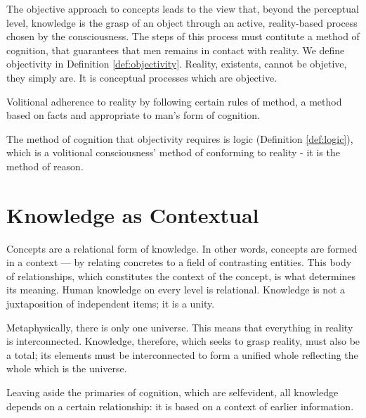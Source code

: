         The objective approach to concepts leads to the view that, beyond the perceptual level, knowledge is the grasp of an object through an active, reality-based process chosen by the consciousness. The steps of this process must contitute a method of cognition, that guarantees that men remains in contact with reality. We define objectivity in Definition \ref{def:objectivity}. Reality, existents, cannot be objetive, they simply are. It is conceptual processes which are objective.

            \begin{definition}[Obectivity]
            \label{def:objectivity}
                Volitional adherence to reality by following certain rules of method, a method based on facts and appropriate to man's form of cognition.
            \end{definition}

        The method of cognition that objectivity requires is logic (Definition \ref{def:logic}), which is a volitional consciousness' method of conforming to reality - it is the method of reason. %

    \section{Knowledge as Contextual}

        Concepts are a relational form of knowledge. In other words, concepts are formed in a context — by relating concretes to a field of contrasting entities. This body of relationships, which constitutes the context of the concept, is what determines its meaning. Human knowledge on every level is relational. Knowledge is not a juxtaposition of independent items; it is a unity.

        
        Metaphysically, there is only one universe. This means that everything in reality is interconnected. Knowledge, therefore, which seeks to grasp reality, must also be a total; its elements must be interconnected to form a unified whole reflecting the whole which is the universe.

        Leaving aside the primaries of cognition, which are selfevident, all knowledge depends on a certain relationship: it is based on a context of earlier information.

